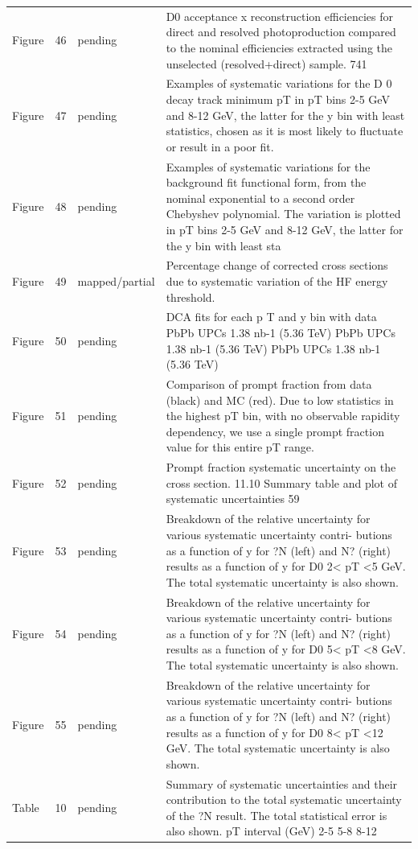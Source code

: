 \documentclass[11pt]{article}
\begin{document}
\begin{longtable}{lll p{}}
Figure & 46 & pending & D0 acceptance x reconstruction efficiencies for direct and resolved photoproduction compared to the nominal efficiencies extracted using the unselected (resolved+direct) sample. 741 \\
Figure & 47 & pending & Examples of systematic variations for the D 0 decay track minimum pT in pT bins 2-5 GeV and 8-12 GeV, the latter for the y bin with least statistics, chosen as it is most likely to fluctuate or result in a poor fit. \\
Figure & 48 & pending & Examples of systematic variations for the background fit functional form, from the nominal exponential to a second order Chebyshev polynomial. The variation is plotted in pT bins 2-5 GeV and 8-12 GeV, the latter for the y bin with least sta \\
Figure & 49 & mapped/partial & Percentage change of corrected cross sections due to systematic variation of the HF energy threshold. \\
Figure & 50 & pending & DCA fits for each p T and y bin with data PbPb UPCs 1.38 nb-1 (5.36 TeV) PbPb UPCs 1.38 nb-1 (5.36 TeV) PbPb UPCs 1.38 nb-1 (5.36 TeV) \\
Figure & 51 & pending & Comparison of prompt fraction from data (black) and MC (red). Due to low statistics in the highest pT bin, with no observable rapidity dependency, we use a single prompt fraction value for this entire pT range. \\
Figure & 52 & pending & Prompt fraction systematic uncertainty on the cross section. 11.10 Summary table and plot of systematic uncertainties 59 \\
Figure & 53 & pending & Breakdown of the relative uncertainty for various systematic uncertainty contri- butions as a function of y for ?N (left) and N? (right) results as a function of y for D0 2< pT <5 GeV. The total systematic uncertainty is also shown. \\
Figure & 54 & pending & Breakdown of the relative uncertainty for various systematic uncertainty contri- butions as a function of y for ?N (left) and N? (right) results as a function of y for D0 5< pT <8 GeV. The total systematic uncertainty is also shown. \\
Figure & 55 & pending & Breakdown of the relative uncertainty for various systematic uncertainty contri- butions as a function of y for ?N (left) and N? (right) results as a function of y for D0 8< pT <12 GeV. The total systematic uncertainty is also shown. \\
Table & 10 & pending & Summary of systematic uncertainties and their contribution to the total systematic uncertainty of the ?N result. The total statistical error is also shown. pT interval (GeV) 2-5 5-8 8-12 \\

\end{longtable}
\end{document}
